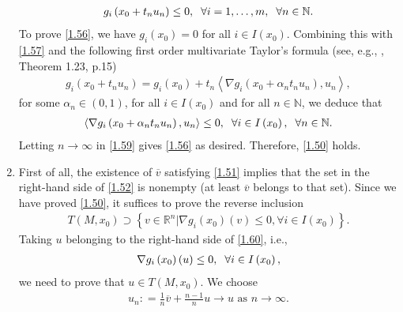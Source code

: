 \documentclass[a4paper]{article}
\numberwithin{equation}{section}
\begin{document}
\begin{enumerate}
\begin{align}
\label{1.57}
{g_i}\left( {{x_0} + {t_n}{u_n}} \right) \le 0,\hspace{0.2cm}\forall i = 1, \ldots ,m,\hspace{0.2cm} \forall n \in \mathbb{N}.
\end{align}
To prove \eqref{1.56}, we have $g_i\left(x_0\right)=0$ for all $i\in I\left(x_0\right)$. Combining this with \eqref{1.57} and the following first  order multivariate Taylor's formula (see, e.g., \cite{1}, Theorem 1.23, p.15) 
\begin{align}
\label{1.58}
{g_i}\left( {{x_0} + {t_n}{u_n}} \right) = {g_i}\left( {{x_0}} \right) + {t_n}\left\langle {\nabla {g_i}\left( {{x_0} + \alpha _n {t_n}{u_n}} \right),{u_n}} \right\rangle ,
\end{align}
for some $\alpha _n \in \left(0,1\right)$, for all $i\in I\left(x_0\right)$ and for all $n\in \mathbb{N}$, we deduce that 
\begin{align}
\label{1.59}
\left\langle {\nabla {g_i}\left( {{x_0} + \alpha _n {t_n}{u_n}} \right),{u_n}} \right\rangle  \le 0,\hspace{0.2cm}\forall i \in I\left( {{x_0}} \right), \hspace{0.2cm} \forall n \in \mathbb{N}.
\end{align}
Letting $n\to \infty$ in \eqref{1.59} gives \eqref{1.56} as desired. Therefore, \eqref{1.50} holds.
\item First of all, the existence of $\overline{v}$ satisfying \eqref{1.51} implies that the set in the right-hand side of \eqref{1.52} is nonempty (at least $\overline{v}$ belongs to that set). Since we have proved \eqref{1.50}, it suffices to prove the reverse inclusion
\begin{align}
\label{1.60}
T\left( {M,{x_0}} \right) \supset \left\{ {v \in {\mathbb{R}^n}|\nabla {g_i}\left( {{x_0}} \right)\left( v \right) \le 0,\forall i \in I\left( {{x_0}} \right)} \right\}.
\end{align}
Taking $u$ belonging to the right-hand side of \eqref{1.60}, i.e., 
\begin{align}
\label{1.61}
\nabla {g_i}\left( {{x_0}} \right)\left( u \right) \le 0, \hspace{0.2cm}\forall i \in I\left( {{x_0}} \right),
\end{align}
we need to prove that $u\in T\left(M,x_0\right)$. We choose 
\begin{align}
{u_n}: = \frac{1}{n}\overline v  + \frac{{n - 1}}{n}u \to u \mbox{ as } n\to \infty .

\end{align}
\end{enumerate}
\end{document}
